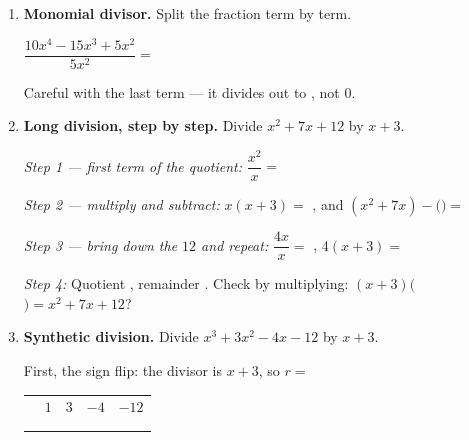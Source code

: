 \documentclass[10pt]{article}
\begin{document}
\begin{tcolorbox}[colback=white, colframe=black!40, title=\textbf{Tier R --- Remediate},
    fonttitle=\bfseries, arc=1.5mm, left=3mm, right=3mm, top=2mm, bottom=2mm, breakable]
\begin{enumerate}[leftmargin=1.7em, itemsep=9pt]
  \item \textbf{Monomial divisor.} Split the fraction term by term.

    \vspace{2pt}
    $\dfrac{10x^4 - 15x^3 + 5x^2}{5x^2} = $ \blank{5.0cm}

    \vspace{2pt}
    Careful with the last term --- it divides out to \blank{1.2cm}, not $0$.

  \item \textbf{Long division, step by step.} Divide $x^2 + 7x + 12$ by $x + 3$.

    \vspace{3pt}
    \emph{Step 1 --- first term of the quotient:} $\dfrac{x^2}{x} = $ \blank{1.4cm}

    \vspace{3pt}
    \emph{Step 2 --- multiply and subtract:} $x(x+3) = $ \blank{2.4cm}, and
    $(x^2+7x) - ($\blank{2.4cm}$) = $ \blank{1.6cm}

    \vspace{3pt}
    \emph{Step 3 --- bring down the $12$ and repeat:} $\dfrac{4x}{x} = $ \blank{1.0cm}, \;
    $4(x+3) = $ \blank{2.0cm}

    \vspace{3pt}
    \emph{Step 4:} Quotient \blank{2.0cm}, remainder \blank{1.2cm}. \; Check by multiplying:
    $(x+3)($\blank{1.6cm}$) = x^2+7x+12$? \blank{1.2cm}

  \item \textbf{Synthetic division.} Divide $x^3 + 3x^2 - 4x - 12$ by $x + 3$.

    \vspace{3pt}
    First, the sign flip: the divisor is $x + 3$, so $r = $ \blank{1.0cm}
    \begin{center}
    \renewcommand{\arraystretch}{1.6}
    \begin{tabular}{r|C{1.4cm}C{1.4cm}C{1.4cm}C{1.4cm}}
        & $1$ & $3$ & $-4$ & $-12$ \\
        &     &     &      &       \\ 
        &     &     &      &       \\
    \end{tabular}
    \end{center}


\end{enumerate}
\end{tcolorbox}
\end{document}
